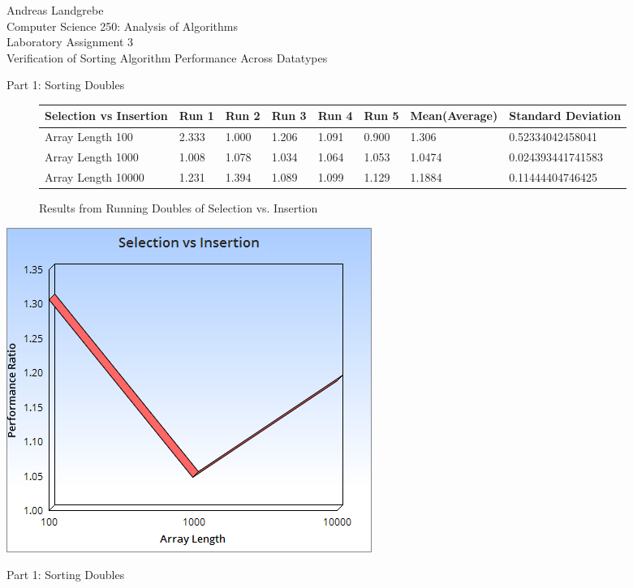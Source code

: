 \documentclass{article}
\begin{document}
\noindent
\begin{center}
Andreas Landgrebe
\\
Computer Science 250: Analysis of Algorithms
\\
Laboratory Assignment 3
\\
Verification of Sorting Algorithm Performance Across Datatypes
\end{center}

\newpage
\begin{center}
Part 1: Sorting Doubles
\end{center}

\begin{figure}[H]
\centering
\begin{adjustwidth}{-3.2cm}{}
\begin{tabular}{| l | l | l | l | l | l | l | l |}
\hline
Selection vs Insertion & Run 1 & Run 2 & Run 3 & Run 4 & Run 5 & Mean(Average) & Standard Deviation\\ \hline
Array Length 100 & 2.333 &1.000 & 1.206 & 1.091 & 0.900 & 1.306 & 0.52334042458041 \\ \hline
Array Length 1000 &1.008 &1.078 & 1.034 & 1.064  & 1.053 & 1.0474 & 0.024393441741583 \\ \hline
Array Length 10000 & 1.231 & 1.394 & 1.089 & 1.099 & 1.129  & 1.1884 & 0.11444404746425 \\ \hline

\end{tabular}
\caption{Results from Running Doubles of Selection vs. Insertion}
\end{adjustwidth}
\end{figure}
\includegraphics[scale=0.5]{Doubles1.png}
\begin{center}
Part 1: Sorting Doubles
\end{center}
\end{document}
